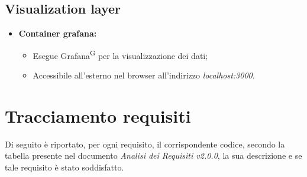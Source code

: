 \documentclass[8pt]{article}
\newcommand{\glossterm}[1]{#1\textsuperscript{G}} %
\begin{document}
\subsection{Visualization layer}
\begin{itemize}
    \item \textbf{Container grafana:}
    \begin{itemize}
        \item Esegue \glossterm{Grafana} per la visualizzazione dei dati;
        \item Accessibile all'esterno nel browser all'indirizzo \textit{localhost:3000}.
    \end{itemize}
\end{itemize}
\newpage
\section{Tracciamento requisiti}\label{sec:trac}
Di seguito è riportato, per ogni requisito, il corrispondente codice, secondo la tabella presente nel documento \textit{Analisi dei Requisiti v2.0.0}, la sua descrizione e se tale requisito è stato soddisfatto.
\setcounter{row}{0}
\newcommand{\rownumber}{\stepcounter{row}\arabic{row}}
\renewcommand{\arraystretch}{2.5}
\end{document}
